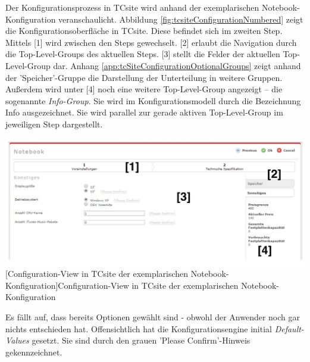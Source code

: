 \documentclass[11pt, a4paper, titlepage, listof=totoc, bibliography=totoc, index=totoc, twoside, openright, headings=normal]{scrreprt}
\begin{document}
Der Konfigurationsprozess in TCsite wird anhand der exemplarischen Notebook-Konfiguration veranschaulicht. Abbildung \ref{fig:tcsiteConfigurationNumbered} zeigt die Konfigurationsoberfläche in TCsite. Diese befindet sich im zweiten Step. Mittels [1] wird zwischen den Steps gewechselt. [2] erlaubt die Navigation durch die Top-Level-Groups des aktuellen Steps. [3] stellt die Felder der aktuellen Top-Level-Group dar. Anhang \ref{app:tcSiteConfigurationOptionalGroups} zeigt anhand der 'Speicher'-Gruppe die Darstellung der Unterteilung in weitere Gruppen. Außerdem wird unter [4] noch eine weitere Top-Level-Group angezeigt -- die sogenannte \emph{Info-Group}. Sie wird im Konfigurationsmodell durch die Bezeichnung \glqq Info\grqq{} ausgezeichnet. Sie wird parallel zur gerade aktiven Top-Level-Group im jeweiligen Step dargestellt.

\vspace{1em}
\begin{minipage}{\linewidth}
	\centering
	\includegraphics[width=1\linewidth]{Abbildungen/tcsiteConfigurationNumbered.pdf}
	[Configuration-View in TCsite der exemplarischen Notebook-Konfiguration]{Configuration-View in TCsite der exemplarischen Notebook-Konfiguration}
	\label{fig:tcsiteConfigurationNumbered}
\end{minipage}
\vspace{0.3em}

Es fällt auf, dass bereits Optionen gewählt sind - obwohl der Anwender noch gar nichts entschieden hat. Offensichtlich hat die Konfigurationsengine initial \emph{Default-Values} gesetzt. Sie sind durch den grauen 'Please Confirm'-Hinweis gekennzeichnet.
\end{document}
